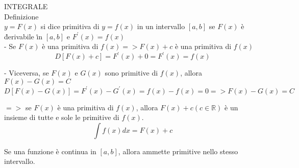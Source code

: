 \documentclass[11pt]{article}
\begin{document}
INTEGRALE \\
Definizione\\
$y= F(x)$ si dice primitiva di $y=f(x)$ in un intervallo $[a, b]$ se $F(x)$ è \. derivabile \. in $[a, b]$ e $F^{'}(x) = f(x)$ \\

- Se $F(x)$ è una primitiva di $f(x) => F(x) + c$ è una primitiva di $f(x)$
$$D[F(x)+c] = F^{'}(x)+0 = F^{'}(x)=f(x)$$

- Viceversa, se $F(x)$ e $G(x)$ sono primitive di $f(x)$, allora $F(x) - G(x) = C$
$$D[F(x)-G(x)] = F^{'}(x)-G^{'}(x) = f(x)-f(x) = 0 => F(x)-G(x) = C$$

$=>$ se $F(x)$ è una primitiva di $f(x)$, allora $F(x)+c (c \in \mathbb{R})$ è un insieme di tutte e sole le primitive di $f(x)$.
$$\int f(x) dx = F(x)+c$$

Se una funzione è continua in $[a, b]$, allora ammette primitive nello stesso intervallo.
\end{document}
